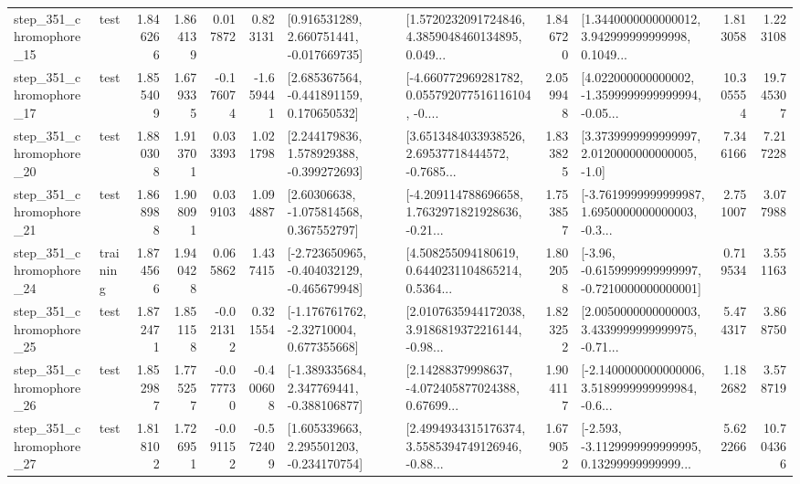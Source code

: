 \begin{tabular}{llrrrrllrlrr}
  step\_351\_chromophore\_15 &      test &      1.846266 &    1.864139 &      0.017872 &  0.823131 &    [0.916531289, 2.660751441, -0.017669735] &  [1.5720232091724846, 4.3859048460134895, 0.049... &       1.846720 &  [1.3440000000000012, 3.942999999999998, 0.1049... &            1.813058 &          1.223108 \\
  step\_351\_chromophore\_17 &      test &      1.855409 &    1.679335 &     -0.176074 & -1.659441 &    [2.685367564, -0.441891159, 0.170650532] &  [-4.660772969281782, 0.055792077516116104, -0.... &       2.059948 &  [4.022000000000002, -1.3599999999999994, -0.05... &           10.305554 &         19.745307 \\
  step\_351\_chromophore\_20 &      test &      1.880308 &    1.913701 &      0.033393 &  1.021798 &    [2.244179836, 1.578929388, -0.399272693] &  [3.6513484033938526, 2.69537718444572, -0.7685... &       1.833825 &     [3.3739999999999997, 2.0120000000000005, -1.0] &            7.346166 &          7.217228 \\
  step\_351\_chromophore\_21 &      test &      1.868988 &    1.908091 &      0.039103 &  1.094887 &     [2.60306638, -1.075814568, 0.367552797] &  [-4.209114788696658, 1.7632971821928636, -0.21... &       1.753857 &  [-3.7619999999999987, 1.6950000000000003, -0.3... &            2.751007 &          3.077988 \\
  step\_351\_chromophore\_24 &  training &      1.874566 &    1.940428 &      0.065862 &  1.437415 &  [-2.723650965, -0.404032129, -0.465679948] &  [4.508255094180619, 0.6440231104865214, 0.5364... &       1.802058 &  [-3.96, -0.6159999999999997, -0.7210000000000001] &            0.719534 &          3.551163 \\
  step\_351\_chromophore\_25 &      test &      1.872471 &    1.851158 &     -0.021312 &  0.321554 &    [-1.176761762, -2.32710004, 0.677355668] &  [2.0107635944172038, 3.9186819372216144, -0.98... &       1.823252 &  [2.0050000000000003, 3.4339999999999975, -0.71... &            5.474317 &          3.868750 \\
  step\_351\_chromophore\_26 &      test &      1.852987 &    1.775257 &     -0.077730 & -0.400608 &   [-1.389335684, 2.347769441, -0.388106877] &  [2.14288379998637, -4.072405877024388, 0.67699... &       1.904117 &  [-2.1400000000000006, 3.5189999999999984, -0.6... &            1.182682 &          3.578719 \\
  step\_351\_chromophore\_27 &      test &      1.818102 &    1.726951 &     -0.091152 & -0.572409 &    [1.605339663, 2.295501203, -0.234170754] &  [2.4994934315176374, 3.5585394749126946, -0.88... &       1.679052 &  [-2.593, -3.1129999999999995, 0.13299999999999... &            5.622266 &         10.704366 \\

\end{tabular}
